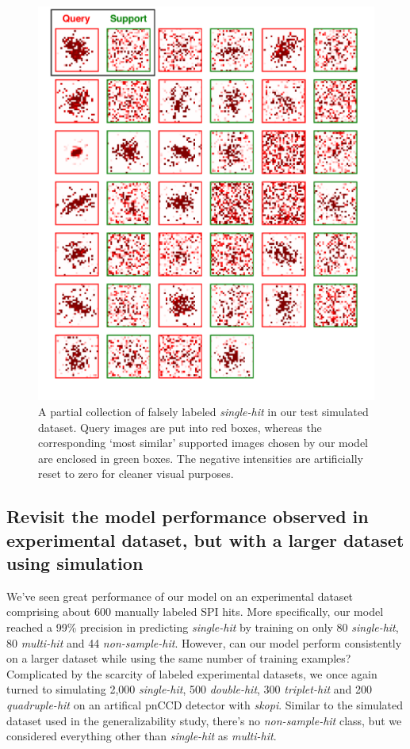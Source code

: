 \begin{figure}
\includegraphics[width=\textwidth,height=0.8\textheight,keepaspectratio]
{figures/false_label.single.simulated.pdf}

\caption{A partial collection of falsely labeled \textit{single-hit} in our test
simulated dataset.  Query images are put into red boxes, whereas the
corresponding `most similar' supported images chosen by our model are enclosed
in green boxes.  The negative intensities are artificially reset to zero for
cleaner visual purposes.  }

\label{fig : false single simulated}
\end{figure}


\subsection{Revisit the model performance observed in experimental dataset,
but with a larger dataset using simulation}

We've seen great performance of our model on an experimental dataset comprising
about 600 manually labeled SPI hits.  More specifically, our model reached a
99\% precision in predicting \textit{single-hit} by training on only 80
\textit{single-hit}, 80 \textit{multi-hit} and 44 \textit{non-sample-hit}.
However, can our model perform consistently on a larger dataset while using
the same number of training examples?  Complicated by the scarcity of labeled
experimental datasets, we once again turned to simulating 2,000
\textit{single-hit}, 500 \textit{double-hit}, 300 \textit{triplet-hit} and 200
\textit{quadruple-hit} on an artifical pnCCD detector with \textit{skopi}.
Similar to the simulated dataset used in the generalizability study, there's no
\textit{non-sample-hit} class, but we considered everything other than
\textit{single-hit} as \textit{multi-hit}.  

